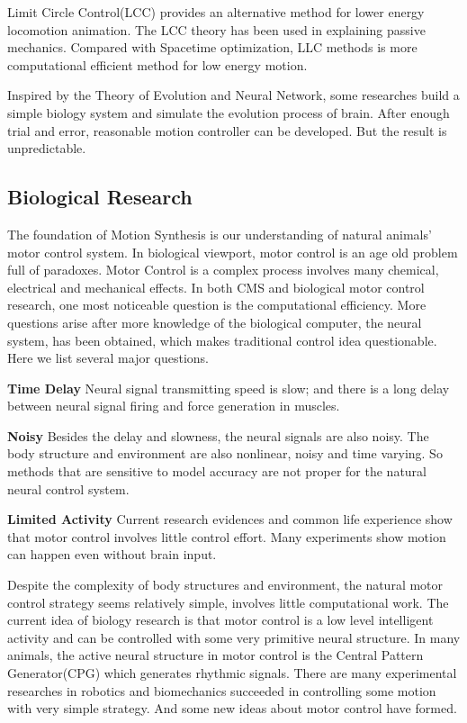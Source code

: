 Limit Circle Control(LCC) \citep{Laszlo1996} provides an alternative method for lower energy locomotion animation. 
The LCC theory has been used in explaining passive mechanics.  
Compared with Spacetime optimization, LLC methods is more computational efficient method for low energy motion.

Inspired by the Theory of Evolution and Neural Network, some researches\citep{Sims} build a simple biology system and simulate the evolution process of brain. 
After enough trial and error, reasonable motion controller can be developed. 
But the result is unpredictable. 
\subsection{Biological Research}
The foundation of Motion Synthesis is our understanding of natural animals' motor control system. 
In biological viewport, motor control is an age old problem full of paradoxes.
Motor Control is a complex process involves many chemical, electrical and mechanical effects.
In both CMS and biological motor control research, one most noticeable question is the computational efficiency.
More questions arise after more knowledge of the biological computer, the neural system, has been obtained,
which makes traditional control idea questionable. 
Here we list several major questions\citep{Glynn2003}.  

\textbf{Time Delay}
Neural signal transmitting speed is slow; and there is a long delay between neural signal firing and force generation in muscles. 

\textbf{Noisy}
Besides the delay and slowness, the neural signals are also noisy. 
The body structure and environment are also nonlinear, noisy and time varying. 
So methods that are sensitive to model accuracy are not proper for the natural neural control system.

\textbf{Limited Activity}
Current research evidences and common life experience show that motor control involves little control effort. 
Many experiments show motion can happen even without brain input. 


Despite the complexity of body structures and environment, the natural motor control strategy seems relatively simple, involves little computational work. 
The current idea of biology research is that motor control is a low level intelligent activity and can be controlled with some very primitive neural structure. 
In many animals, the active neural structure in motor control is the Central Pattern Generator(CPG) which generates rhythmic signals.
There are many experimental researches in robotics and biomechanics succeeded in controlling some motion with very simple strategy\citep{nishikawa2007neuromechanics}.
And some new ideas about motor control have formed.

